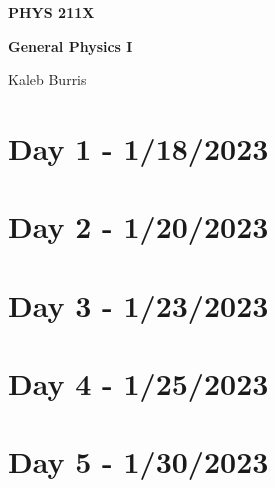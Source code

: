 \documentclass[12pt, letterpaper]{book}
\begin{document}
    \begin{titlepage}
        \Huge \textbf{PHYS 211X}

        \huge \textbf{General Physics I}

        \vfill

        \Large Kaleb Burris
    \end{titlepage}

    \section*{Day 1 - 1/18/2023}

    

    \section*{Day 2 - 1/20/2023}

    

    \section*{Day 3 - 1/23/2023}

    

    \section*{Day 4 - 1/25/2023}

    

    \section*{Day 5 - 1/30/2023}

    
\end{document}

